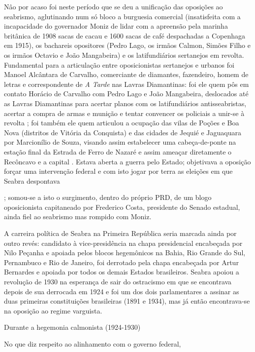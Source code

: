 Nâo por acaso foi neste período que se deu a unificação das oposições ao seabrismo, aglutinando num só bloco a burguesia comercial (insatisfeita com a incapacidade do governador Moniz de lidar com a apreensão pela marinha britânica de 1908 sacas de cacau e 1600 sacas de café despachadas a Copenhaga em 1915), os bachareis opositores (Pedro Lago, os irmãos Calmon, Simões Filho e os irmãos Octavio e João Mangabeira) e os latifundiários sertanejos em revolta. Fundamental para a articulação entre oposicionistas sertanejos e urbanos foi Manoel Alcântara de Carvalho, comerciante de diamantes, fazendeiro, homem de letras e correspondente de \textit{A Tarde} nas Lavras Diamantinas: foi ele quem pôs em contato Horácio de Carvalho com Pedro Lago e João Mangabeira, deslocados até as Lavras Diamantinas para acertar planos com os latifundiários antisseabristas, acertar a compra de armas e munição e tentar convencer os policiais a unir-se à revolta \cite[p.~201]{CUNHA2011}; foi também ele quem articulou a ocupação das vilas de Poções e Boa Nova (distritos de Vitória da Conquista) e das cidades de Jequié e Jaguaquara por Marcionílio de Souza, visando assim estabelecer uma cabeça-de-ponte na estação final da Estrada de Ferro de Nazaré e assim ameaçar diretamente o Recôncavo e a capital \cite[p.~202]{CUNHA2011}. Estava aberta a guerra pelo Estado; objetivava a oposição forçar uma intervenção federal e com isto jogar por terra as eleições em que Seabra despontava  

; somou-se a isto o surgimento, dentro do próprio PRD, de um blogo oposicionista capitaneado por Frederico Costa, presidente do Senado estadual, ainda fiel ao seabrismo mas rompido com Moniz. 



A carreira política de Seabra na Primeira República seria marcada ainda por outro revés: candidato à vice-presidência na chapa presidencial encabeçada por Nilo Peçanha e apoiada pelos blocos hegemônicos na Bahia, Rio Grande do Sul, Pernambuco e Rio de Janeiro, foi derrotado pela chapa encabeçada por Artur Bernardes e apoiada por todos os demais Estados brasileiros. Seabra apoiou a revolução de 1930 na esperança de sair do ostracismo em que se encontrava depois de sua derrocada em 1924 e foi um dos dois parlamentares a assinar as duas primeiras constituições brasileiras (1891 e 1934), mas já então encontrava-se na oposição ao regime varguista.


Durante a hegemonia calmonista (1924-1930) 




No que diz respeito ao alinhamento com o governo federal, 







